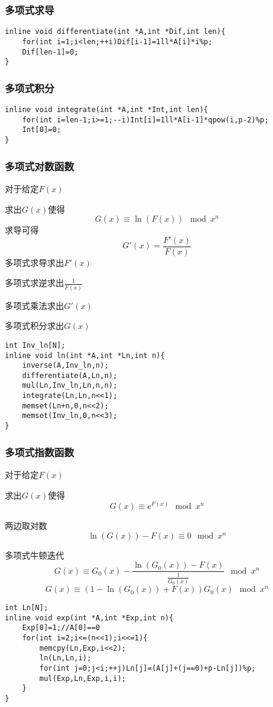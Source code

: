 \documentclass{ctexart}
\begin{document}
\subsubsection{多项式求导}
\begin{lstlisting}
inline void differentiate(int *A,int *Dif,int len){
	for(int i=1;i<len;++i)Dif[i-1]=1ll*A[i]*i%p;
	Dif[len-1]=0;
}
\end{lstlisting}
\subsubsection{多项式积分}
\begin{lstlisting}
inline void integrate(int *A,int *Int,int len){
	for(int i=len-1;i>=1;--i)Int[i]=1ll*A[i-1]*qpow(i,p-2)%p;
	Int[0]=0;
}
\end{lstlisting}
\subsubsection{多项式对数函数}
对于给定$F(x)$

求出$G(x)$使得
$$
G(x)\equiv \ln(F(x)) \mod x^n
$$
求导可得
$$
G'(x)=\frac{F'(x)}{F(x)}
$$
多项式求导求出$F'(x)$

多项式求逆求出$\frac{1}{F(x)}$

多项式乘法求出$G'(x)$

多项式积分求出$G(x)$
\begin{lstlisting}
int Inv_ln[N];
inline void ln(int *A,int *Ln,int n){
	inverse(A,Inv_ln,n);
    differentiate(A,Ln,n); 
	mul(Ln,Inv_ln,Ln,n,n);
	integrate(Ln,Ln,n<<1);
	memset(Ln+n,0,n<<2);
	memset(Inv_ln,0,n<<3);
}
\end{lstlisting}
\subsubsection{多项式指数函数}
对于给定$F(x)$

求出$G(x)$使得
$$
G(x)\equiv e^{F(x)} \mod x^n
$$

两边取对数
$$
\ln(G(x))-F(x)\equiv 0 \mod x^n
$$

多项式牛顿迭代
$$
G(x)\equiv G_0(x)-\frac{\ln(G_0(x))-F(x)}{\frac{1}{G_0(x)}} \mod x^n
$$
$$
 G(x) \equiv (1-\ln(G_0(x))+F(x))G_0(x) \mod x^n
$$
\begin{lstlisting}
int Ln[N];
inline void exp(int *A,int *Exp,int n){
    Exp[0]=1;//A[0]==0 
    for(int i=2;i<=(n<<1);i<<=1){
        memcpy(Ln,Exp,i<<2);
        ln(Ln,Ln,i);
        for(int j=0;j<i;++j)Ln[j]=(A[j]+(j==0)+p-Ln[j])%p;
		mul(Exp,Ln,Exp,i,i);
    }
}
\end{lstlisting}
\end{document}
